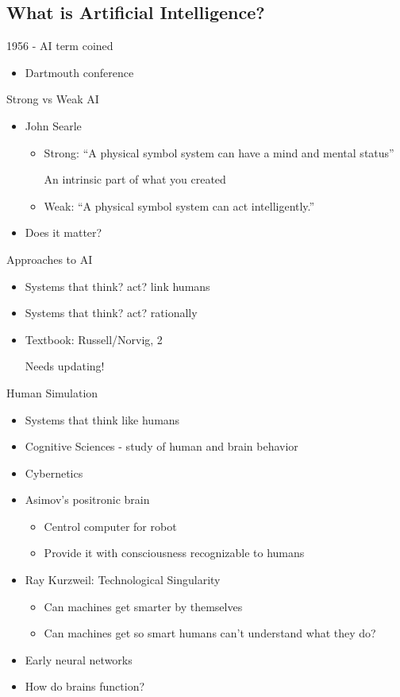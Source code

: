 \subsection{What is Artificial Intelligence?}

1956 - AI term coined 
\begin{itemize}
  \item Dartmouth conference
\end{itemize}

Strong vs Weak AI
\begin{itemize}
  \item John Searle
        \begin{itemize}
          \item Strong: ``A physical symbol system can have a mind and mental status''
		
		  An intrinsic part of what you created
	   \item Weak: ``A physical symbol system can act intelligently.''
        \end{itemize}
  \item Does it matter? 
\end{itemize}

Approaches to AI
\begin{itemize}
  \item Systems that think? act? link humans
  \item Systems that think? act? rationally
  \item Textbook: Russell/Norvig, 2

	 Needs updating! 
\end{itemize}

Human Simulation
\begin{itemize}
  \item Systems that think like humans
  \item Cognitive Sciences - study of human and brain behavior
  \item Cybernetics
  \item Asimov's positronic brain
        \begin{itemize}
          \item Centrol computer for robot	
	   \item Provide it with consciousness recognizable to humans 
        \end{itemize}
  \item Ray Kurzweil: Technological Singularity
        \begin{itemize}
          \item Can machines get smarter by themselves
	   \item Can machines get so smart humans can't understand what they do?
        \end{itemize}
  \item Early neural networks 
  \item How do brains function? 
\end{itemize}

